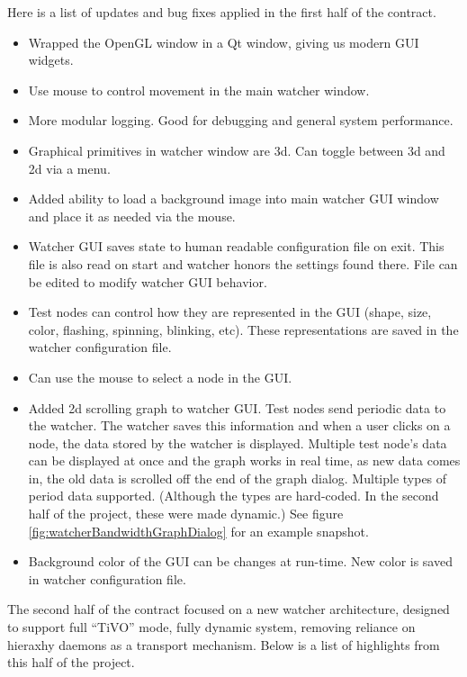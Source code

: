 \documentclass{report}
\begin{document}
Here is a list of updates and bug fixes applied in the first half of the contract.

\begin{itemize}
\item Wrapped the OpenGL window in a Qt window, giving us modern GUI widgets. 
\item Use mouse to control movement in the main watcher window.
\item More modular logging. Good for debugging and general system performance.
\item Graphical primitives in watcher window are 3d. Can toggle between 3d and 2d via a menu.
\item Added ability to load a background image into main watcher GUI window and place it as needed via the mouse.
\item Watcher GUI saves state to human readable configuration file on exit. This file is also read on start and watcher honors the 
settings found there. File can be edited to modify watcher GUI behavior.
\item Test nodes can control how they are represented in the GUI (shape, size, color, flashing, spinning, blinking, etc). These representations
are saved in the watcher configuration file.
\item Can use the mouse to select a node in the GUI.
\item Added 2d scrolling graph to watcher GUI. Test nodes send periodic data to the watcher. The watcher saves this information and when 
a user clicks on a node, the data stored by the watcher is displayed. Multiple test node's data can be displayed at once and the graph
works in real time, as new data comes in, the old data is scrolled off the end of the graph dialog. Multiple types of period data 
supported. (Although the types are hard-coded. In the second half of the project, these were made dynamic.) See figure \ref{fig:watcherBandwidthGraphDialog} 
for an example snapshot.
\item Background color of the GUI can be changes at run-time. New color is saved in watcher configuration file.
\end{itemize}

The second half of the contract focused on a new watcher architecture, designed to support full ``TiVO'' mode, fully dynamic system, removing reliance
on hieraxhy daemons as a transport mechanism. Below is a list of highlights from this half of the project.
\end{document}
